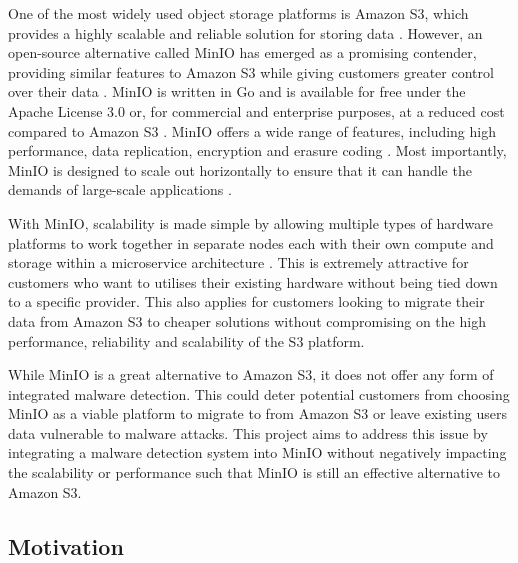 \documentclass[12pt, conference, final, a4paper, onecolumn, compsoc]{IEEEtran}
\begin{document}
One of the most widely used object storage platforms is Amazon S3, which
provides a highly scalable and reliable solution for storing data
\citep{cloud-review}. However, an open-source alternative called MinIO has
emerged as a promising contender, providing similar features to Amazon S3 while
giving customers greater control over their data \citep{minio}. MinIO is written
in Go and is available for free under the Apache License 3.0 or, for commercial
and enterprise purposes, at a reduced cost compared to Amazon S3
\citep{minio-pricing}. MinIO offers a wide range of features, including high
performance, data replication, encryption and erasure coding \citep{minio}. Most
importantly, MinIO is designed to scale out horizontally to ensure that it can
handle the demands of large-scale applications \citep{minio}.

With MinIO, scalability is made simple by allowing multiple types of hardware
platforms to work together in separate nodes each with their own compute and
storage within a microservice architecture \citep{minio}. This is extremely
attractive for customers who want to utilises their existing hardware without
being tied down to a specific provider. This also applies for customers looking
to migrate their data from Amazon S3 to cheaper solutions without compromising on
the high performance, reliability and scalability of the S3 platform.

While MinIO is a great alternative to Amazon S3, it does not offer any form of
integrated malware detection. This could deter potential customers from choosing
MinIO as a viable platform to migrate to from Amazon S3 or leave existing users
data vulnerable to malware attacks. This project aims to address this issue by
integrating a malware detection system into MinIO without negatively impacting
the scalability or performance such that MinIO is still an effective alternative
to Amazon S3.

\subsection{Motivation} %
\paragraph{}
\end{document}
